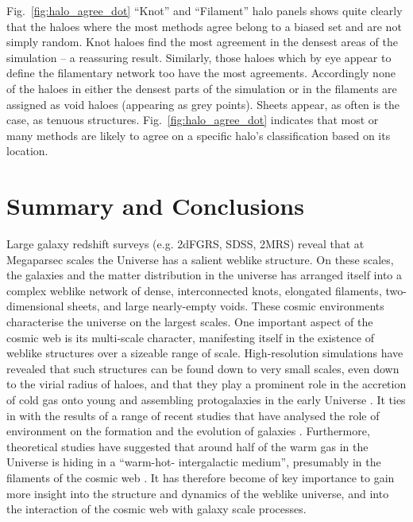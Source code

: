 \documentclass[useAMS,usenatbib]{mnras}
\begin{document}
Fig.~\ref{fig:halo_agree_dot} ``Knot'' and ``Filament'' halo panels shows quite clearly that the haloes where the most methods agree belong to a biased set and are not simply random. Knot haloes find the most agreement in the densest areas of the simulation -- a reassuring result. Similarly, those haloes which by eye appear to define the filamentary network too have the most agreements. Accordingly none of the haloes in either the densest parts of the simulation or in the filaments are assigned as void haloes (appearing as grey points). Sheets appear, as often is the case, as tenuous structures. Fig.~\ref{fig:halo_agree_dot} indicates that most or many methods are likely to agree on a specific halo's classification based on its location.

\section{Summary and Conclusions}
Large galaxy redshift surveys (e.g. 2dFGRS, SDSS, 2MRS) reveal that at Megaparsec scales
the Universe has a salient weblike structure. On these scales, the galaxies and  the matter distribution in the
universe has arranged itself into a complex weblike network of dense, interconnected knots,
elongated filaments, two-dimensional sheets, and  large nearly-empty voids. These cosmic environments characterise the universe on the largest scales. 
One important aspect of the cosmic web is its multi-scale character, manifesting itself in the existence of weblike
structures over a sizeable range of scale. High-resolution simulations have revealed
that such structures can be found down to very small scales, even down to the virial radius
of haloes, and that they play a prominent role in the accretion of cold gas onto young and
assembling protogalaxies in the early Universe \citep{2012MNRAS.422.1732D}. It ties in with the results of a range of recent studies that have analysed the role of environment on the formation and the evolution of galaxies \citep[e.g.][]{2013ApJ...776...71C,2015MNRAS.448.3665E,2015ApJ...800..112G,2015ApJ...800L...4C,2016MNRAS.455..127M,2017A&A...597A..86P}. Furthermore, theoretical studies have suggested that around half of the warm gas in the Universe is hiding in a ``warm-hot- intergalactic medium'', presumably in the filaments of the cosmic web \citep[e.g.][]{2015Natur.528..105E}. It has therefore become of key importance to gain more insight into the structure and dynamics of the weblike universe, and into the interaction of the cosmic web with galaxy scale processes.
\end{document}
